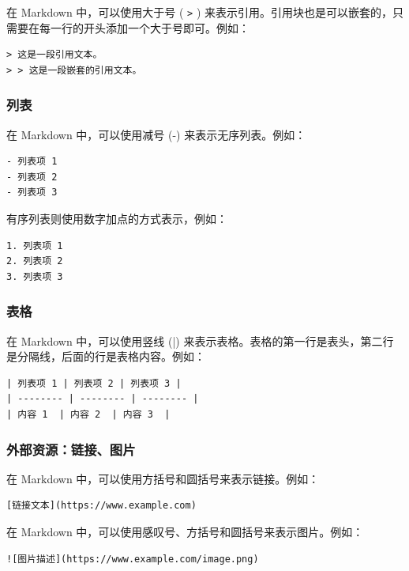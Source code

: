 在 Markdown 中，可以使用大于号 ( \texttt{>} ) 来表示引用。引用块也是可以嵌套的，只需要在每一行的开头添加一个大于号即可。例如：

\begin{verbatim}
> 这是一段引用文本。
> > 这是一段嵌套的引用文本。
\end{verbatim}

\subsubsection{列表}

在 Markdown 中，可以使用减号 (-) 来表示无序列表。例如：

\begin{verbatim}
- 列表项 1
- 列表项 2
- 列表项 3
\end{verbatim}

有序列表则使用数字加点的方式表示，例如：

\begin{verbatim}
1. 列表项 1
2. 列表项 2
3. 列表项 3
\end{verbatim}

\subsubsection{表格}

在 Markdown 中，可以使用竖线 (|) 来表示表格。表格的第一行是表头，第二行是分隔线，后面的行是表格内容。例如：

\begin{verbatim}
| 列表项 1 | 列表项 2 | 列表项 3 |
| -------- | -------- | -------- |
| 内容 1  | 内容 2  | 内容 3  |
\end{verbatim}

\subsubsection{外部资源：链接、图片}

在 Markdown 中，可以使用方括号和圆括号来表示链接。例如：

\begin{verbatim}
[链接文本](https://www.example.com)
\end{verbatim}

在 Markdown 中，可以使用感叹号、方括号和圆括号来表示图片。例如：

\begin{verbatim}
![图片描述](https://www.example.com/image.png)
\end{verbatim}

